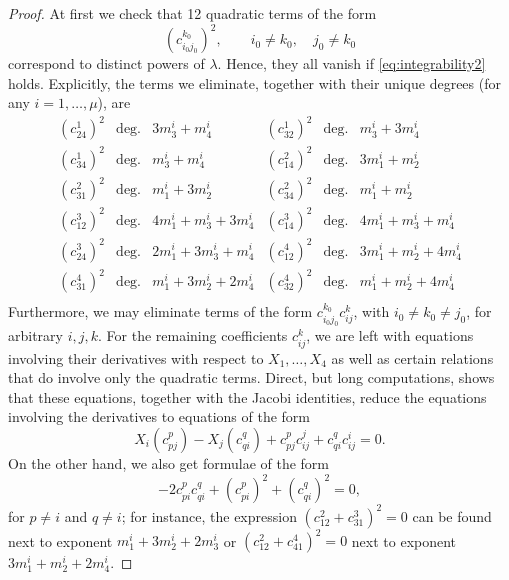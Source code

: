 \documentclass[11pt]{amsart}
\theoremstyle{definition}
\begin{document}
\begin{proof}
At first we check that 12 quadratic terms of the form
\[
(c^{k_0}_{i_0j_0})^2, \qquad i_0\neq k_0, \quad j_0\neq k_0
\]
correspond to distinct powers of $\lambda$. Hence, they all vanish if  \eqref{eq:integrability2} holds. Explicitly, the terms we eliminate, together with their unique degrees (for any $i=1,\ldots,\mu$), are
\renewcommand{\arraystretch}{1.3}
\[
\begin{array}{ccl|ccl}
(c^1_{24})^2 & \text{deg.} & 3m^i_3+m^i_4 & (c^1_{32})^2 & \text{deg.} & m^i_3+3m^i_4 \\
(c^1_{34})^2 & \text{deg.} & m^i_3+m^i_4 & (c^2_{14})^2 & \text{deg.} & 3m^i_1+m^i_2 \\
(c^2_{31})^2 & \text{deg.} & m^i_1+3m^i_2 & (c^2_{34})^2 & \text{deg.} & m^i_1+m^i_2 \\
(c^3_{12})^2 & \text{deg.} & 4m^i_1+m^i_3+3m^i_4 & (c^3_{14})^2 & \text{deg.} & 4m^i_1+m^i_3+m^i_4 \\
(c^3_{24})^2 & \text{deg.} & 2m^i_1+3m^i_3+m^i_4 & (c^4_{12})^2 & \text{deg.} & 3m^i_1+m^i_2+4m^i_4 \\
(c^4_{31})^2 & \text{deg.} & m^i_1+3m^i_2+2m^i_4 & (c^4_{32})^2 & \text{deg.} & m^i_1+m^i_2+4m^i_4 \\
\end{array}
\]
Furthermore, we may eliminate terms of the form $c^{k_0}_{i_0j_0}c^k_{ij}$, with $i_0\neq k_0\neq j_0$, for arbitrary $i,j,k$. For the remaining coefficients $c_{ij}^k$, we are left with equations involving their derivatives with respect to $X_1,\ldots,X_4$ as well as certain relations that do involve only the quadratic terms. Direct, but long computations, shows that these equations, together with the Jacobi identities, reduce the equations involving the derivatives to equations of the form
\begin{equation}\label{eq:der}
X_i(c^p_{pj})-X_j(c^q_{qi})+c^p_{pj}c^j_{ij}+c^q_{qi}c^i_{ij}=0.
\end{equation}
On the other hand, we also get formulae of the form
\begin{equation}\label{eq:quadr}
-2c^p_{pi}c^q_{qi}+\left(c^p_{pi}\right)^2+\left(c^q_{qi}\right)^2=0,
\end{equation}
for $p\neq i$ and $q\neq i$; for instance, the expression $(c^2_{12}+c^3_{31})^2=0$ can be found next to exponent $m_1^i+3m_2^i+2m_3^i$ or $(c^2_{12}+c^4_{41})^2=0$ next to exponent $3m_1^i+m_2^i+2m_4^i$.

\end{proof}
\end{document}
